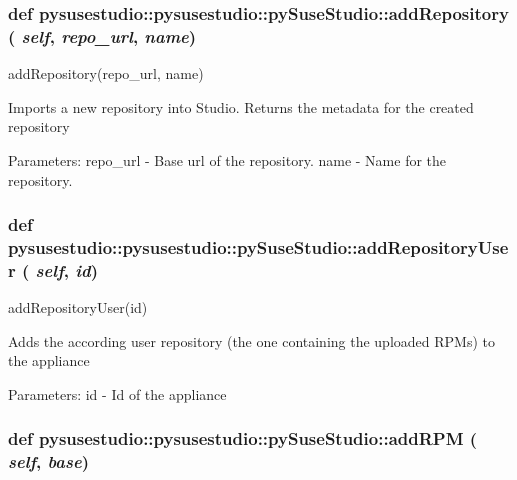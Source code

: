  \hypertarget{classpysusestudio_1_1pysusestudio_1_1py_suse_studio_a0ac81e92b04d4d62acb3d9f3b2bb263a}{
\subsubsection[{addRepository}]{\setlength{\rightskip}{0pt plus 5cm}def pysusestudio::pysusestudio::pySuseStudio::addRepository ( {\em self}, \/   {\em repo\_\-url}, \/   {\em name})}}
\label{classpysusestudio_1_1pysusestudio_1_1py_suse_studio_a0ac81e92b04d4d62acb3d9f3b2bb263a}
\begin{DoxyVerb}addRepository(repo_url, name)

            Imports a new repository into Studio. Returns the metadata for the created repository
            
            Parameters:
repo_url - Base url of the repository. 
name - Name for the repository. 

\end{DoxyVerb}
 \hypertarget{classpysusestudio_1_1pysusestudio_1_1py_suse_studio_a6d7393a206d04f8c0b9a288f92d6c34a}{
\subsubsection[{addRepositoryUser}]{\setlength{\rightskip}{0pt plus 5cm}def pysusestudio::pysusestudio::pySuseStudio::addRepositoryUser ( {\em self}, \/   {\em id})}}
\label{classpysusestudio_1_1pysusestudio_1_1py_suse_studio_a6d7393a206d04f8c0b9a288f92d6c34a}
\begin{DoxyVerb}addRepositoryUser(id)

            Adds the according user repository (the one containing the uploaded RPMs) to the appliance
            
            Parameters:
id - Id of the appliance

\end{DoxyVerb}
 \hypertarget{classpysusestudio_1_1pysusestudio_1_1py_suse_studio_a6b47e03a278d2d51e82eeecb6420f2e1}{
\subsubsection[{addRPM}]{\setlength{\rightskip}{0pt plus 5cm}def pysusestudio::pysusestudio::pySuseStudio::addRPM ( {\em self}, \/   {\em base})}}
